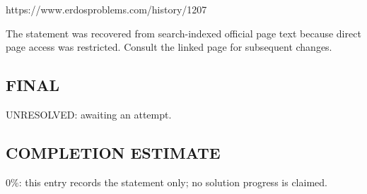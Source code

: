 https://www.erdosproblems.com/history/1207

The statement was recovered from search-indexed official page text because direct page access was restricted. Consult the linked page for subsequent changes.

\subsection*{FINAL}
UNRESOLVED: awaiting an attempt.

\subsection*{COMPLETION ESTIMATE}
$0\%$: this entry records the statement only; no solution progress is claimed.
